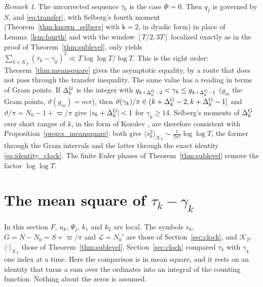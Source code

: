\documentclass[11pt,a4paper]{article}
\makeatletter
\numberwithin{equation}{section}
\DeclareRobustCommand{\CGref}[1]{\ref{#1}}
\DeclareRobustCommand{\CGeqref}[1]{\eqref{#1}}
\DeclareRobustCommand{\CGcite}[2][]{\if\relax\detokenize{#1}\relax\cite{#2}\else\cite[#1]{#2}\fi}
\let\CG@origref\ref
\let\CG@origeqref\eqref
\newcommand{\CG@gettip}[1]{\@ifundefined{CGTip@#1}{#1}{\csname CGTip@#1\endcsname}}
\newcommand{\CG@getbib}[1]{\@ifundefined{CGBib@#1}{#1}{\csname CGBib@#1\endcsname}}
\DeclareRobustCommand{\CGref}[1]{\pdftooltip{\CG@origref{#1}}{\CG@gettip{#1}}}
\DeclareRobustCommand{\CGeqref}[1]{\pdftooltip{\CG@origeqref{#1}}{\CG@gettip{#1}}}
\DeclareRobustCommand{\CGcite}[2][]{\pdftooltip{\if\relax\detokenize{#1}\relax\cite{#2}\else\cite[#1]{#2}\fi}{\CG@getbib{#2}}}
\theoremstyle{definition}
\theoremstyle{remark}
\newtheorem{remark}[theorem]{Remark}
\newcommand{\Nz}{N_0} %
\newcommand{\lL}{\mathcal L}
\newcommand{\Ph}{\Phi}
\newcommand{\Kc}{\mathcal K}
\makeatother
\begin{document}
\begin{remark}\label{rem:bare_clock}
The uncorrected sequence $\tau_k$ is the case $\Ph=0$. Then $q_f$ is governed by $S$, and \CGeqref{eq:transfer}, with Selberg's fourth moment (Theorem~\CGref{thm:known_selberg} with $\mathsf k=2$, in dyadic form) in place of Lemma~\CGref{lem:fourth} and with the window $[T/2,3T]$ localized exactly as in the proof of Theorem~\CGref{thm:sublevel}, only yields $\sum_{k\in\Kc_T}(\tau_k-\gamma_k)^2\ll T\log\log T/\log T$. This is the right order: Theorem~\CGref{thm:meansquare} gives the asymptotic equality, by a route that does not pass through the transfer inequality. The same value has a reading in terms of Gram points. If $\Delta^{\rm G}_k$ is the integer with $g_{k+\Delta^{\rm G}_k-2}<\gamma_k\le g_{k+\Delta^{\rm G}_k-1}$ ($g_m$ the Gram points, $\vartheta(g_m)=m\pi$), then $\vartheta(\gamma_k)/\pi\in(k+\Delta^{\rm G}_k-2,k+\Delta^{\rm G}_k-1]$ and $\vartheta/\pi=\Nz-1+\varpi/\pi$ give $|s_k+\Delta^{\rm G}_k|<1$ for $\gamma_k\ge14$. Selberg's moments of $\Delta^{\rm G}_k$ over short ranges of $k$, in the form of Korolev \CGcite[Thm.~4.2]{Korolev2012}, are therefore consistent with Proposition~\CGref{prop:s_meansquare}: both give $\langle s_k^2\rangle_{\Kc_T}\sim\frac1{2\pi^2}\log\log T$, the former through the Gram intervals and the latter through the exact identity \CGeqref{eq:identity_clock}. The finite Euler phases of Theorem~\CGref{thm:sublevel} remove the factor $\log\log T$.
\end{remark}

\section{The mean square of \texorpdfstring{$\tau_k-\gamma_k$}{tau\_k - gamma\_k}}\label{sec:meansquare}

In this section $F$, $u_k$, $\Psi_j$, $k_1$ and $k_2$ are local. The symbols $s_k$, $G=N-\Nz=S+\varpi/\pi$ and $\lL=\Nz'$ are those of Section~\CGref{sec:clock}, and $\Kc_T$, $\langle\cdot\rangle_{\Kc_T}$ those of Theorem~\CGref{thm:sublevel}. Section~\CGref{sec:clock} compared $\tau_k$ with $\gamma_k$ one index at a time. Here the comparison is in mean square, and it rests on an identity that turns a sum over the ordinates into an integral of the counting function. Nothing about the zeros is assumed.
\end{document}
